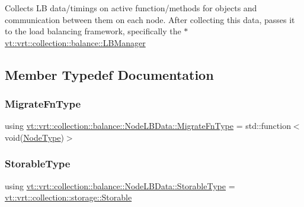 Collects LB data/timings on active function/methods for objects and communication between them on each node. After collecting this data, passes it to the load balancing framework, specifically the {\ttfamily $\ast$} \hyperlink{structvt_1_1vrt_1_1collection_1_1balance_1_1_l_b_manager}{vt\+::vrt\+::collection\+::balance\+::\+L\+B\+Manager} 

\subsection{Member Typedef Documentation}
\mbox{\label{structvt_1_1vrt_1_1collection_1_1balance_1_1_node_l_b_data_a200140e389d08dc8d74db16589e736bc}} 
\subsubsection{\texorpdfstring{Migrate\+Fn\+Type}{MigrateFnType}}
{\footnotesize\ttfamily using \hyperlink{structvt_1_1vrt_1_1collection_1_1balance_1_1_node_l_b_data_a200140e389d08dc8d74db16589e736bc}{vt\+::vrt\+::collection\+::balance\+::\+Node\+L\+B\+Data\+::\+Migrate\+Fn\+Type} =  std\+::function$<$void(\hyperlink{namespacevt_a866da9d0efc19c0a1ce79e9e492f47e2}{Node\+Type})$>$}

\mbox{\label{structvt_1_1vrt_1_1collection_1_1balance_1_1_node_l_b_data_adf6ad57c147c8e9d6b47e07a437bb1a6}} 
\subsubsection{\texorpdfstring{Storable\+Type}{StorableType}}
{\footnotesize\ttfamily using \hyperlink{structvt_1_1vrt_1_1collection_1_1balance_1_1_node_l_b_data_adf6ad57c147c8e9d6b47e07a437bb1a6}{vt\+::vrt\+::collection\+::balance\+::\+Node\+L\+B\+Data\+::\+Storable\+Type} =  \hyperlink{structvt_1_1vrt_1_1collection_1_1storage_1_1_storable}{vt\+::vrt\+::collection\+::storage\+::\+Storable}}



